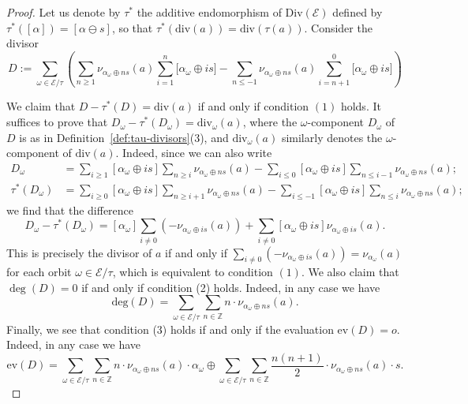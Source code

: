 \documentclass[preprint,12pt]{elsarticle}
\numberwithin{equation}{section} %
\theoremstyle{theorem}
\theoremstyle{definition}
\newcommand{\ec}{\mathcal{E}} %
\newcommand{\idec}{{o}} %
\newcommand{\orbita}{{\ec/\tau}} %
\newcommand{\Z}{\mathbb{Z}} %
\begin{document}
 \begin{proof} Let us denote by $\tau^*$ the additive endomorphism of $\mathrm{Div}(\ec)$ defined by $\tau^*([\alpha])=[\alpha\ominus s]$, so that $\tau^*(\mathrm{div}(a))=\mathrm{div}(\tau(a))$. Consider the divisor
     \begin{equation}\label{eq:gauge-divisor-def}D:=\sum_{\omega\in\orbita}\left(\sum_{n\geq 1}\nu_{\alpha_\omega\oplus ns}(a)\sum_{i=1}^n\bigl[\alpha_\omega\oplus is\bigr]-\sum_{n\leq -1}\nu_{\alpha_\omega\oplus ns}(a)\sum_{i=n+1}^{0}\bigl[\alpha_\omega\oplus is\bigr]\right)\end{equation} 
     
    We claim that $D-\tau^*(D)=\mathrm{div}(a)$ if and only if condition $(1)$ holds. It suffices to prove that $D_\omega-\tau^*(D_\omega)=\mathrm{div}_\omega(a)$, where the $\omega$-component $D_\omega$ of $D$ is as in Definition~\ref{def:tau-divisors}(3), and $\mathrm{div}_\omega(a)$ similarly denotes the $\omega$-component of $\mathrm{div}(a)$. Indeed, since we can also write  
     \begin{align*}
         D_\omega &= \sum\limits_{i\geq 1}[\alpha_{\omega}\oplus is]\sum\limits_{n\geq i} \nu_{\alpha_{\omega}\oplus ns}(a) - \sum\limits_{i\leq 0}[\alpha_{\omega}\oplus is]\sum\limits_{n\leq i-1} \nu_{\alpha_{\omega}\oplus ns}(a);\\
         \tau^*(D_\omega) &= \sum\limits_{i\geq 0}[\alpha_{\omega}\oplus is]\sum\limits_{n\geq i+1} \nu_{\alpha_{\omega}\oplus ns}(a) - \sum\limits_{i\leq -1}[\alpha_{\omega}\oplus is]\sum\limits_{n\leq i} \nu_{\alpha_{\omega}\oplus ns}(a);
     \end{align*}
     we find that the difference 
     \[D_\omega-\tau^*(D_\omega) = [\alpha_{\omega}]\sum\limits_{i\neq 0} (-\nu_{\alpha_{\omega}\oplus is}(a)) + \sum\limits_{i\neq 0} [\alpha_{\omega}\oplus is]\nu_{\alpha_{\omega}\oplus is}(a).\]
     This is precisely the divisor of $a$ if and only if $\sum\limits_{i\neq 0}(-\nu_{\alpha_{\omega}\oplus is}(a)) = \nu_{\alpha_{\omega}}(a)$ for each orbit $\omega\in\orbita$, which is equivalent to condition $(1)$. We also claim that $\deg(D)=0$ if and only if condition (2) holds. Indeed, in any case we have 
     \[\mathrm{deg}(D)=\sum\limits_{\omega\in\orbita}\sum\limits_{n\in\mathbb{Z}} n\cdot \nu_{\alpha_{\omega}\oplus ns}(a).\]
    Finally, we see that condition (3) holds if and only if the evaluation $\mathrm{ev}(D)=\idec$. Indeed, in any case we have  \[\mathrm{ev}(D)=\displaystyle\sum_{\omega\in\orbita}\sum_{n\in\Z}n\cdot\nu_{\alpha_\omega\oplus ns}(a)\cdot\alpha_{\omega} \oplus \displaystyle\sum_{\omega\in\orbita}\sum_{n\in\Z}\dfrac{n(n+1)}{2}\cdot \nu_{\alpha_{\omega}\oplus ns}(a)\cdot s.\]
    

\end{proof}
\end{document}

